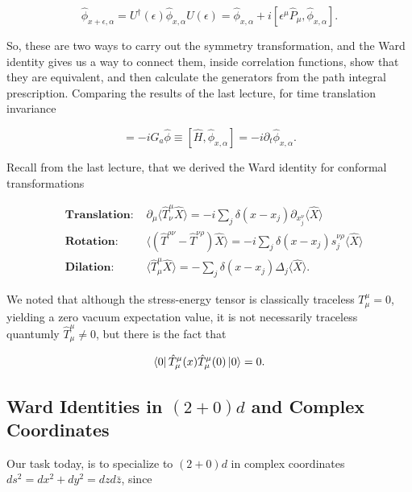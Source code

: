 \begin{equation}
\hat{\phi}_{x+\epsilon, \alpha} = U^\dagger (\epsilon) \hat{\phi}_{x, \alpha} U(\epsilon) = \hat{\phi}_{x, \alpha} + i [\epsilon^\mu \hat{P}_\mu, \hat{\phi}_{x, \alpha}].
\end{equation}

\noindent So, these are two ways to carry out the symmetry transformation, and the Ward identity gives us a way to connect them, inside correlation functions, show that they are equivalent, and then calculate the generators from the path integral prescription. Comparing the results of the last lecture, for time translation invariance

\begin{equation}
[\hat{Q}_a, \hat{\phi}] = -i G_a \hat{\phi} \equiv[\hat{H}, \hat{\phi}_{x, \alpha}] = -i \partial_t \hat{\phi}_{x,\alpha}.
\end{equation}

\noindent Recall from the last lecture, that we derived the Ward identity for conformal transformations

\begin{align}
&\textbf{Translation: } &\partial_\mu \langle \hat{T}^\mu_\nu \hat{X} \rangle = -i \sum_j \delta(x-x_j) \partial_{x_j^\nu} \langle \hat{X} \rangle \\
&\textbf{Rotation: } &\langle (\hat{T}^{\rho\nu} - \hat{T}^{\nu\rho} ) \hat{X} \rangle = -i \sum_j \delta(x-x_j) s_j^{\nu\rho} \langle \hat{X} \rangle \\
&\textbf{Dilation: } &\langle \hat{T}^\mu_\mu \hat{X} \rangle = - \sum_j \delta(x-x_j) \Delta_j \langle \hat{X} \rangle.
\end{align}

\noindent We noted that although the stress-energy tensor is classically traceless $T^\mu_\mu = 0$, yielding a zero vacuum expectation value, it is not necessarily traceless quantumly $\hat{T}^\mu_\mu \ne 0$, but there is the fact that

\begin{equation}
\bra{0} \hat{T}_\mu^\mu (x) \hat{T}^\mu_\mu (0) \ket{0} = 0.
\end{equation}

\subsection*{Ward Identities in $(2+0)d$ and Complex Coordinates}

\noindent Our task today, is to specialize to $(2+0)d$ in complex coordinates $ds^2 = dx^2 + dy^2 = dz d\bar{z}$, since

